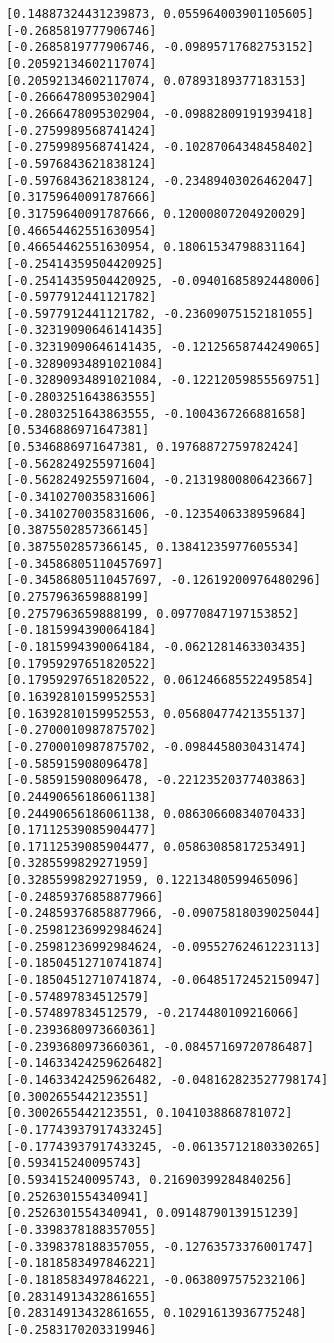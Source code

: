 \documentclass[11pt]{article}
\begin{document}
\begin{Verbatim}[commandchars=\\\{\}]
[0.14887324431239873, 0.055964003901105605]
[-0.2685819777906746]
[-0.2685819777906746, -0.09895717682753152]
[0.20592134602117074]
[0.20592134602117074, 0.07893189377183153]
[-0.2666478095302904]
[-0.2666478095302904, -0.09882809191939418]
[-0.2759989568741424]
[-0.2759989568741424, -0.10287064348458402]
[-0.5976843621838124]
[-0.5976843621838124, -0.23489403026462047]
[0.31759640091787666]
[0.31759640091787666, 0.12000807204920029]
[0.46654462551630954]
[0.46654462551630954, 0.18061534798831164]
[-0.25414359504420925]
[-0.25414359504420925, -0.09401685892448006]
[-0.5977912441121782]
[-0.5977912441121782, -0.23609075152181055]
[-0.32319090646141435]
[-0.32319090646141435, -0.12125658744249065]
[-0.32890934891021084]
[-0.32890934891021084, -0.12212059855569751]
[-0.2803251643863555]
[-0.2803251643863555, -0.1004367266881658]
[0.5346886971647381]
[0.5346886971647381, 0.19768872759782424]
[-0.5628249255971604]
[-0.5628249255971604, -0.21319800806423667]
[-0.3410270035831606]
[-0.3410270035831606, -0.1235406338959684]
[0.3875502857366145]
[0.3875502857366145, 0.13841235977605534]
[-0.34586805110457697]
[-0.34586805110457697, -0.12619200976480296]
[0.2757963659888199]
[0.2757963659888199, 0.09770847197153852]
[-0.1815994390064184]
[-0.1815994390064184, -0.0621281463303435]
[0.17959297651820522]
[0.17959297651820522, 0.061246685522495854]
[0.16392810159952553]
[0.16392810159952553, 0.05680477421355137]
[-0.2700010987875702]
[-0.2700010987875702, -0.0984458030431474]
[-0.585915908096478]
[-0.585915908096478, -0.22123520377403863]
[0.24490656186061138]
[0.24490656186061138, 0.08630660834070433]
[0.17112539085904477]
[0.17112539085904477, 0.05863085817253491]
[0.3285599829271959]
[0.3285599829271959, 0.12213480599465096]
[-0.24859376858877966]
[-0.24859376858877966, -0.09075818039025044]
[-0.25981236992984624]
[-0.25981236992984624, -0.09552762461223113]
[-0.18504512710741874]
[-0.18504512710741874, -0.06485172452150947]
[-0.574897834512579]
[-0.574897834512579, -0.2174480109216066]
[-0.2393680973660361]
[-0.2393680973660361, -0.08457169720786487]
[-0.14633424259626482]
[-0.14633424259626482, -0.048162823527798174]
[0.3002655442123551]
[0.3002655442123551, 0.1041038868781072]
[-0.17743937917433245]
[-0.17743937917433245, -0.06135712180330265]
[0.593415240095743]
[0.593415240095743, 0.21690399284840256]
[0.2526301554340941]
[0.2526301554340941, 0.09148790139151239]
[-0.3398378188357055]
[-0.3398378188357055, -0.12763573376001747]
[-0.1818583497846221]
[-0.1818583497846221, -0.0638097575232106]
[0.28314913432861655]
[0.28314913432861655, 0.10291613936775248]
[-0.2583170203319946]

\end{Verbatim}
\end{document}
